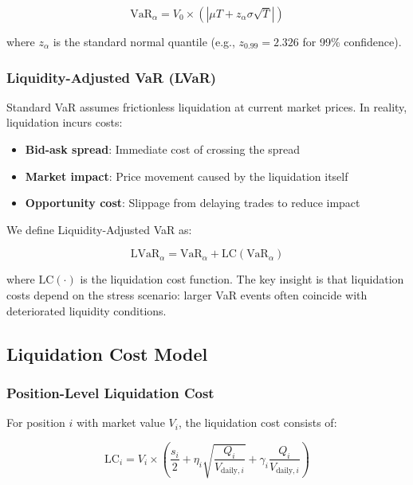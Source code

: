 \documentclass[11pt,a4paper]{article}
\begin{document}
\begin{equation}
\text{VaR}_\alpha = V_0 \times \left(|\mu T + z_\alpha \sigma\sqrt{T}|\right)
\end{equation}

where $z_\alpha$ is the standard normal quantile (e.g., $z_{0.99} = 2.326$ for 99\% confidence).

\subsubsection{Liquidity-Adjusted VaR (LVaR)}

Standard VaR assumes frictionless liquidation at current market prices. In reality, liquidation incurs costs:

\begin{itemize}
    \item \textbf{Bid-ask spread}: Immediate cost of crossing the spread
    \item \textbf{Market impact}: Price movement caused by the liquidation itself
    \item \textbf{Opportunity cost}: Slippage from delaying trades to reduce impact
\end{itemize}

We define Liquidity-Adjusted VaR as:

\begin{equation}
\text{LVaR}_\alpha = \text{VaR}_\alpha + \text{LC}(\text{VaR}_\alpha)
\end{equation}

where $\text{LC}(\cdot)$ is the liquidation cost function. The key insight is that liquidation costs depend on the stress scenario: larger VaR events often coincide with deteriorated liquidity conditions.

\subsection{Liquidation Cost Model}

\subsubsection{Position-Level Liquidation Cost}

For position $i$ with market value $V_i$, the liquidation cost consists of:

\begin{equation}
\text{LC}_i = V_i \times \left(\frac{s_i}{2} + \eta_i \sqrt{\frac{Q_i}{V_{\text{daily},i}}} + \gamma_i \frac{Q_i}{V_{\text{daily},i}}\right)
\end{equation}
\end{document}
